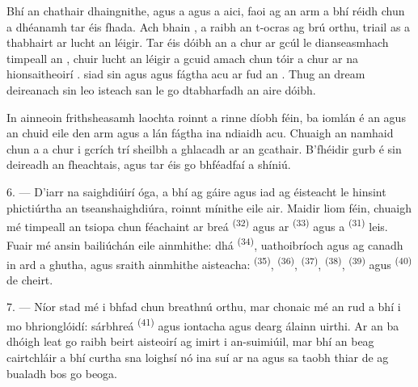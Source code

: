 Bhí an chathair dhaingnithe, agus a  agus a  aici, faoi
 ag an  arm a bhí réidh chun  a
dhéanamh tar éis  fhada. Ach bhain , a raibh an t-ocras ag brú orthu, triail as  a thabhairt ar
 lucht an léigir. Tar éis dóibh an  a chur ar gcúl
le  dianseasmhach timpeall an , chuir lucht an
léigir  a gcuid  amach chun tóir a chur ar na
hionsaitheoirí .  siad sin agus
 agus  fágtha acu ar fud an . Thug  an dream deireanach sin leo isteach san
 le go dtabharfadh an  aire dóibh.

In ainneoin frithsheasamh laochta roinnt  a rinne  díobh
féin, ba iomlán é an  agus  an chuid eile den arm agus
a lán  fágtha ina ndiaidh acu. Chuaigh an namhaid chun a
 a chur i gcrích trí sheilbh a ghlacadh ar an gcathair. B'fhéidir gurb é
sin deireadh an fheachtais, agus tar éis  go bhféadfaí
 a shíniú.

\VUsaut{4.4mm}
\VUsaut{2.8mm}

6. --- D'iarr na saighdiúirí óga, a bhí ag gáire agus iad ag éisteacht le hinsint
phictiúrtha an tseanshaighdiúra, roinnt mínithe eile air. Maidir liom féin, chuaigh
mé timpeall an tsiopa chun féachaint ar  breá
\textsuperscript{(32)} agus ar  \textsuperscript{(33)} agus a
 \textsuperscript{(31)} leis. Fuair mé ansin bailiúchán eile
ainmhithe: dhá  \textsuperscript{(34)}, 
uathoibríoch agus  ag canadh in ard a ghutha, agus sraith ainmhithe
aisteacha:  \textsuperscript{(35)}, 
\textsuperscript{(36)},  \textsuperscript{(37)}, 
\textsuperscript{(38)},  \textsuperscript{(39)} agus 
\textsuperscript{(40)} de cheirt.

7. --- Níor stad mé i bhfad chun breathnú orthu, mar chonaic mé an rud a bhí i mo
bhrionglóidí:  sárbhreá \textsuperscript{(41)} agus
 iontacha agus  dearg álainn uirthi. Ar an
 ba dhóigh leat go raibh beirt aisteoirí ag imirt  i
 an-suimiúil, mar bhí an  beag cairtchláir a
bhí curtha sna loighsí nó ina suí ar na  agus sa
 taobh thiar de  ag bualadh bos
go beoga.

